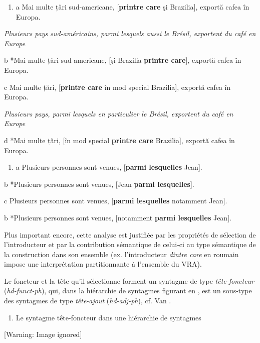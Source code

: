 \begin{enumerate}
\item \label{bkm:Ref296074963}a  Mai multe țări sud-americane, [\textbf{printre care} şi Brazilia], exportă cafea în Europa. 


\end{enumerate}
{\itshape
Plusieurs pays sud-américains, parmi lesquels aussi le Brésil, exportent du café en Europe}

  b  *Mai multe țări sud-americane, [şi Brazilia \textbf{printre care}], exportă cafea în Europa.

  c  Mai multe țări, [\textbf{printre care} în mod special Brazilia], exportă cafea în Europa.

{\itshape
Plusieurs pays, parmi lesquels en particulier le Brésil, exportent du café en Europe}

  d  *Mai multe țări, [în mod special \textbf{printre care} Brazilia], exportă cafea în Europa.


\begin{enumerate}
\item \label{bkm:Ref298760194}a  Plusieurs personnes sont venues, [\textbf{parmi lesquelles} Jean].


\end{enumerate}
  b  *Plusieurs personnes sont venues, [Jean \textbf{parmi lesquelles}].

  c  Plusieurs personnes sont venues, [\textbf{parmi lesquelles} notamment Jean].

  b  *Plusieurs personnes sont venues, [notamment \textbf{parmi lesquelles} Jean].

Plus important encore, cette analyse est justifiée par les propriétés de sélection de l'introducteur et par la contribution sémantique de celui-ci au type sémantique de la construction dans son ensemble (ex. l'introducteur \textit{dintre care} en roumain impose une interprétation partitionnante à l'ensemble du VRA).

Le foncteur et la tête qu'il sélectionne forment un syntagme de type \textit{tête-foncteur} (\textit{hd-funct-ph}), qui, dans la hiérarchie de syntagmes figurant en , est un sous-type des syntagmes de type \textit{tête-ajout} (\textit{hd-adj-ph}), cf. Van \citet{Eynde2007}. 


\begin{enumerate}
\item \label{bkm:Ref299022036}Le syntagme tête-foncteur dans une hiérarchie de syntagmes


\end{enumerate}
  [Warning: Image ignored] %
  

